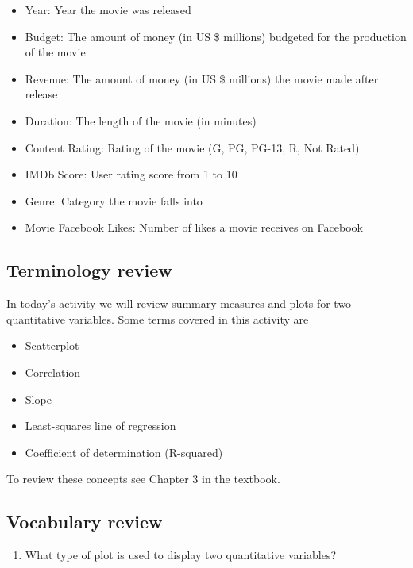 \documentclass[
]{report}
\providecommand{\tightlist}{%
  \setlength{\itemsep}{0pt}\setlength{\parskip}{0pt}}
\begin{document}
\begin{itemize}
\item
  Year: Year the movie was released
\item
  Budget: The amount of money (in US \$ millions) budgeted for the production of the movie
\item
  Revenue: The amount of money (in US \$ millions) the movie made after release
\item
  Duration: The length of the movie (in minutes)
\item
  Content Rating: Rating of the movie (G, PG, PG-13, R, Not Rated)
\item
  IMDb Score: User rating score from 1 to 10
\item
  Genre: Category the movie falls into
\item
  Movie Facebook Likes: Number of likes a movie receives on Facebook
\end{itemize}

\hypertarget{terminology-review}{%
\subsection{Terminology review}\label{terminology-review}}

In today's activity we will review summary measures and plots for two quantitative variables. Some terms covered in this activity are

\begin{itemize}
\item
  Scatterplot
\item
  Correlation
\item
  Slope
\item
  Least-squares line of regression
\item
  Coefficient of determination (R-squared)
\end{itemize}

To review these concepts see Chapter 3 in the textbook.

\hypertarget{vocabulary-review}{%
\subsection{Vocabulary review}\label{vocabulary-review}}

\begin{enumerate}
\def\labelenumi{\arabic{enumi}.}
\tightlist
\item
  What type of plot is used to display two quantitative variables?
\end{enumerate}
\end{document}
